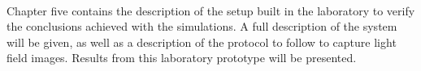 \\
Chapter five contains the description of the setup built in the laboratory to verify the conclusions achieved with the simulations. A full description of the system will be given, as well as a description of the protocol to follow to capture light field images. Results from this laboratory prototype will be presented.
\\

